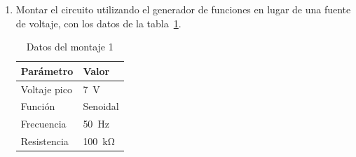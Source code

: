 \documentclass{article}
\begin{document}
    \begin{enumerate}
        \item Montar el circuito utilizando el generador de funciones en lugar de una fuente de voltaje, con los datos de la tabla~\ref{tab:m1}.



        \begin{table}[ht!]
            \centering
            \begin{tabular}{ll}
                \toprule
                Parámetro      & Valor                      \\
                \midrule
                Voltaje pico   & \SI{7}{\volt}              \\
                Función        & Senoidal                   \\
                Frecuencia     & \SI{50}{\hertz}            \\
                Resistencia    & \SI{100}{\kilo\ohm}         \\
                \bottomrule
            \end{tabular}
            \caption{Datos del montaje 1}\label{tab:m1}
        \end{table}


\end{enumerate}
\end{document}
